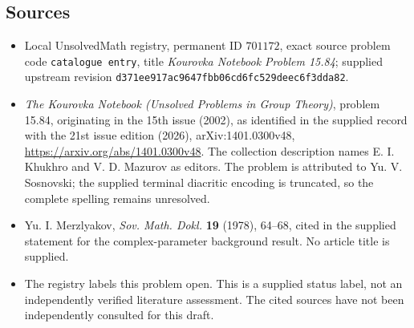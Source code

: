 \documentclass[11pt]{article}
\begin{document}
\subsection{Sources}
\begin{itemize}
\item Local UnsolvedMath registry, permanent ID \(701172\), exact source problem code \texttt{catalogue entry}, title \emph{Kourovka Notebook Problem 15.84}; supplied upstream revision \texttt{d371ee917ac9647fbb06cd6fc529deec6f3dda82}.
\item \emph{The Kourovka Notebook (Unsolved Problems in Group Theory)}, problem 15.84, originating in the 15th issue (2002), as identified in the supplied record with the 21st issue edition (2026), arXiv:1401.0300v48, \url{https://arxiv.org/abs/1401.0300v48}. The collection description names E. I. Khukhro and V. D. Mazurov as editors. The problem is attributed to Yu. V. Sosnovski; the supplied terminal diacritic encoding is truncated, so the complete spelling remains unresolved.
\item Yu. I. Merzlyakov, \emph{Sov. Math. Dokl.} \textbf{19} (1978), 64--68, cited in the supplied statement for the complex-parameter background result. No article title is supplied.
\item The registry labels this problem open. This is a supplied status label, not an independently verified literature assessment. The cited sources have not been independently consulted for this draft.
\end{itemize}
\end{document}
